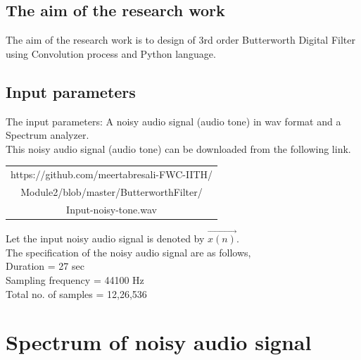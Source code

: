 \documentclass[journal,10pt,twocolumn]{article}
\begin{document}
\subsection{The aim of the research work}
The aim of the research work is to design of 3rd order Butterworth Digital Filter using Convolution process and Python language.


\subsection{Input parameters}
\vspace{0.2cm}
The input parameters: A noisy audio signal (audio tone) in wav format and a Spectrum analyzer. \\
This noisy audio signal (audio tone) can be downloaded from the following link.\\
\begin{table}[h]
\centering
\begin{tabular}{| c |} \hline
 \rule{0pt}{20pt} https://github.com/meertabresali-FWC-IITH/\\
 Module2/blob/master/ButterworthFilter/ \\
 Input-noisy-tone.wav \\\hline
\end{tabular}
\end{table}

\begin{flushleft}
Let the input noisy audio signal is denoted by $\vec{x(n)}$.\\
\vspace{0.25cm}
The specification of the noisy audio signal are as follows,\\
\vspace{0.25cm}
Duration                = 27 sec\\
\vspace{0.25cm}
Sampling frequency      = 44100 Hz\\
\vspace{0.25cm}
Total no. of samples    = 12,26,536
\end{flushleft}


\section{Spectrum of noisy audio signal}
\end{document}
